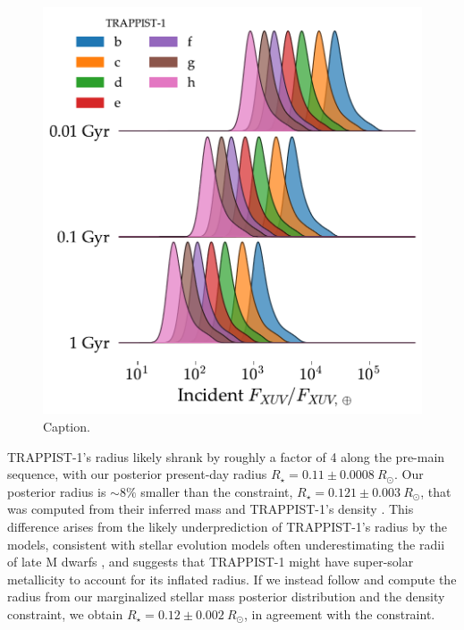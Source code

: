 \documentclass[twocolumn]{aastex62}
\begin{document}
\begin{figure}[]
	\includegraphics[width=\columnwidth]{../Analysis/Fluxes/fluxes.pdf}
   \caption{Caption.}%
    \label{fig:fluxes}%
\end{figure}

TRAPPIST-1's radius likely shrank by roughly a factor of 4 along the pre-main sequence, with our posterior present-day radius $R_{\star} = 0.11 \pm{0.0008} \ R_{\odot}$. Our posterior radius is ${\sim} 8\%$ smaller than the \citet{vanGrootel2018} constraint, $R_{\star} = 0.121 \pm {0.003} \ R_{\odot}$, that was computed from their inferred mass and TRAPPIST-1's density \citep{Delrez2018}. This difference arises from the likely underprediction of TRAPPIST-1's radius by the \citet{Baraffe2015} models, consistent with stellar evolution models often underestimating the radii of late M dwarfs \citep{Reid2005,Spada2013,Jackson2019}, and suggests that TRAPPIST-1 might have super-solar metallicity \citep{Burgasser2017,vanGrootel2018} to account for its inflated radius. If we instead follow \citet{vanGrootel2018} and compute the radius from our marginalized stellar mass posterior distribution and the \citet{Delrez2018} density constraint, we obtain $R_{\star} = 0.12 \pm{0.002} \ R_{\odot}$, in agreement with the \citet{vanGrootel2018} constraint.
\end{document}
